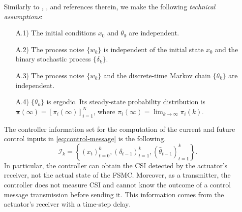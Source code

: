 \documentclass[journal,twoside,web]{ieeecolor}
\begin{document}
Similarly to \cite{yZL-2025-automatica}, \cite{impicciatore2024tac}, and references therein, we make the following \emph{technical assumptions}:
\begin{enumerate}
	\item[A.1)] The initial conditions $x_0$ and $\theta_0$ are independent. %
	\item[A.2)] The process noise $\{w_k\}$ is independent of the initial state $x_0$ and the binary stochastic process $\{\delta_k\}$.
	\item[A.3)] The process noise $\{w_k\}$ and the discrete-time Markov chain $\{\theta_k\}$ are independent.
	\item[A.4)] %
    $\{\theta_k\}$ is ergodic. Its steady-state probability distribution is $\bm{\pi}(\infty) = [\pi_{i}(\infty)]_{i=1}^{N}$, where $\pi_{i}(\infty) = \lim_{k\to\infty} \pi_{i}(k)$.
\end{enumerate}

The controller information set for the computation of the current and future control inputs in \eqref{eq:control-message} is the following.
	\begin{equation}\label{eq:info-set}
\mathcal{I}_{k} = \left\{
	\left(x_{t}\right)_{t=0}^{k}, 
	\left(\delta_{t-1}\right)_{t=1}^{k}, 
	(\hat{\theta}_{t-1})_{t=1}^{k} \right\}.
\end{equation}
In particular, the controller can obtain the CSI detected by the actuator's receiver, not the actual state of the FSMC. Moreover, as a transmitter, the controller does not measure CSI and cannot know the outcome of a control message transmission before sending it. This information comes from the actuator's receiver with a time-step delay.
\end{document}
